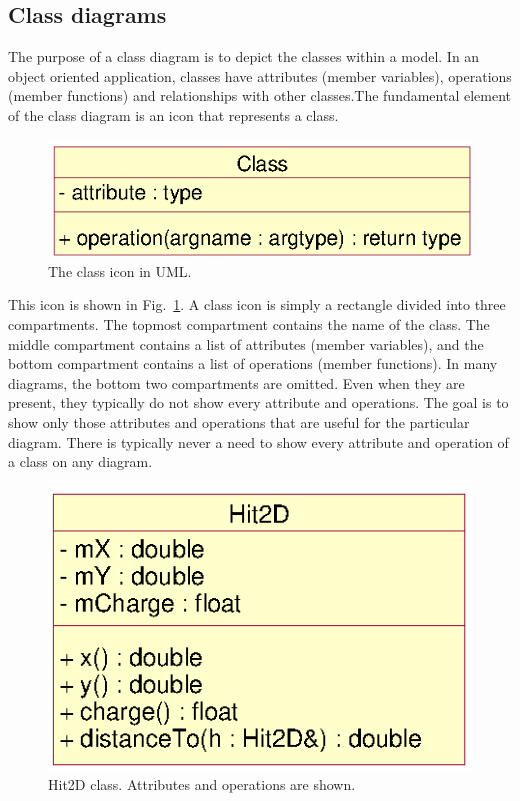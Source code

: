 \documentclass[twoside]{article}
\begin{document}
\subsection{Class diagrams}

The purpose of a class diagram is to depict the classes within a
model. In an object oriented application, classes have attributes
(member variables), operations (member functions) and relationships
with other classes.The fundamental element of the class diagram is an
icon that represents a class.
\begin{figure}[htb]
    \begin{center}
        \includegraphics{umlClassIcon.eps}
        \caption{The class icon in UML.}
        \label{fig:umlClassIcon}
    \end{center}
\end{figure}
This icon is shown in Fig.~\ref{fig:umlClassIcon}.  A class icon is
simply a rectangle divided into three compartments. The topmost
compartment contains the name of the class. The middle compartment
contains a list of attributes (member variables), and the bottom
compartment contains a list of operations (member functions).  In many
diagrams, the bottom two compartments are omitted. Even when they are
present, they typically do not show every attribute and operations.
The goal is to show only those attributes and operations that are
useful for the particular diagram.  There is typically never a need to
show every attribute and operation of a class on any diagram.
\begin{figure}[htb]
    \begin{center}
        \includegraphics{umlClass.eps}
        \caption{Hit2D class. Attributes and operations are shown.}
        \label{fig:umlClass}
    \end{center}
\end{figure}
\end{document}
